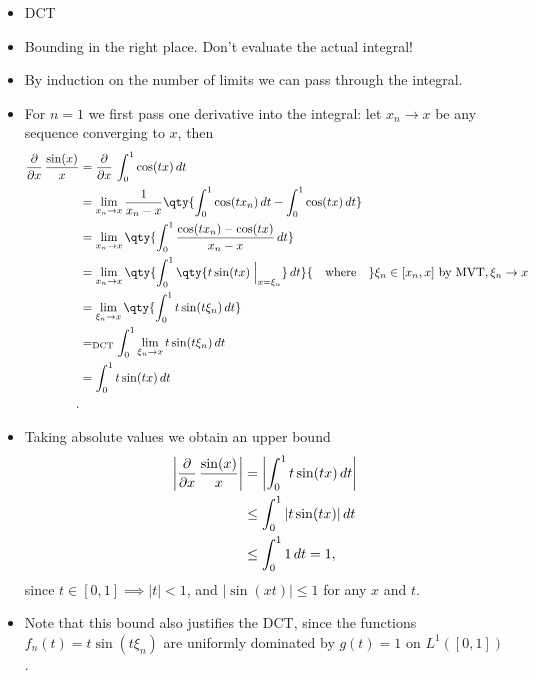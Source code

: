 \begin{solution}

\hfill

\begin{concept}

\hfill

\begin{itemize}
\tightlist
\item
  DCT
\item
  Bounding in the right place. Don't evaluate the actual integral!
\end{itemize}

\end{concept}

\begin{itemize}
\item
  By induction on the number of limits we can pass through the integral.
\item
  For \(n=1\) we first pass one derivative into the integral: let
  \(x_n \to x\) be any sequence converging to \(x\), then
  \begin{align*}
  {\frac{\partial }{\partial x}\,} {\sin(x) \over x} 
  &= {\frac{\partial }{\partial x}\,} \int_0^1 \cos(tx)\,dt  \\
  &= \lim_{x_n\to x} {1\over x_n - x} \qty{ \int_0^1 \cos(t x_n)\,dt  - \int_0^1 \cos(tx) \,dt} \\
  &= \lim_{x_n\to x} \qty{ \int_0^1 { \cos(tx_n)  - \cos(tx) \over x_n - x}   \,dt} \\
  &= \lim_{x_n\to x} \qty{ \int_0^1 \qty{t\sin(tx)\mathrel{\Big|}_{x=\xi_n}}  \,dt} {\quad \operatorname{where} \quad} \xi_n \in [x_n, x] \text{ by MVT}, \xi_n\to x \\
  &= \lim_{\xi_n\to x} \qty{ \int_0^1 t \sin(t \xi_n)  \,dt}  \\
  &=_{\text{DCT}}  \int_0^1 \lim_{\xi_n \to x} t \sin(t \xi_n)  \,dt \\
  &= \int_0^1 t\sin(tx) \,dt \\
  .\end{align*}
\item
  Taking absolute values we obtain an upper bound
  \begin{align*}
  {\left\lvert { {\frac{\partial }{\partial x}\,} {\sin(x) \over x} } \right\rvert} 
  &= {\left\lvert { \int_0^1 t\sin(tx) \,dt } \right\rvert} \\
  &\leq \int_0^1 {\left\lvert {t\sin(tx)} \right\rvert} \,dt \\
  &\leq \int_0^1 1 \, dt = 1
  ,\end{align*}
  since \(t\in [0, 1] \implies {\left\lvert {t} \right\rvert} < 1\), and
  \({\left\lvert {\sin(xt)} \right\rvert} \leq 1\) for any \(x\) and
  \(t\).
\item
  Note that this bound also justifies the DCT, since the functions
  \(f_n(t) = t\sin(t \xi_n )\) are uniformly dominated by \(g(t) = 1\)
  on \(L^1([0, 1])\).
\end{itemize}


\end{solution}
